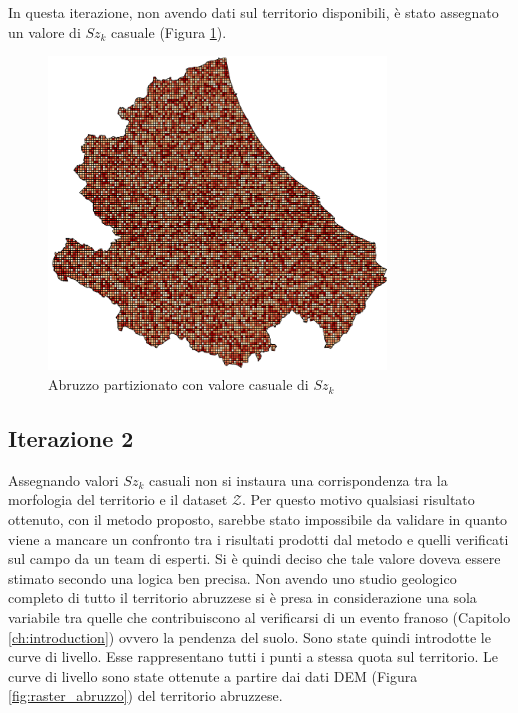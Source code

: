 In questa iterazione, non avendo dati sul territorio disponibili, è stato assegnato un valore di \textit{$Sz_k$} casuale (Figura \ref{fig:abruzzo_random}). 

\begin{figure}[H]
	\centering
	\includegraphics[width=0.8\textwidth]{images/AbruzzoRandom}
	\caption{Abruzzo partizionato con valore casuale di $Sz_k$}
	\label{fig:abruzzo_random}
\end{figure}


\subsection{\textbf{Iterazione 2}}
Assegnando valori $Sz_k$ casuali non si instaura una corrispondenza tra la morfologia del territorio e il dataset $\mathcal{Z}$. Per questo motivo qualsiasi risultato ottenuto, con il metodo proposto, sarebbe stato impossibile da validare in quanto viene a mancare un confronto tra i risultati prodotti dal metodo e quelli verificati sul campo da un team di esperti.    
Si è quindi deciso che tale valore doveva essere stimato secondo una logica ben precisa.
Non avendo uno studio geologico completo di tutto il territorio abruzzese si è presa in  considerazione una sola variabile tra quelle che contribuiscono al verificarsi di un evento franoso (Capitolo \ref{ch:introduction}) ovvero la pendenza del suolo. 
Sono state quindi introdotte le curve di livello. Esse rappresentano tutti i punti a stessa quota sul territorio. Le curve di livello  sono state ottenute a partire dai dati DEM (Figura \ref{fig:raster_abruzzo}) del territorio abruzzese.

